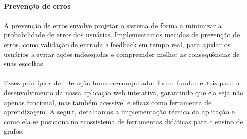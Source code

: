 \documentclass[12pt,a4paper]{article}
\begin{document}
\paragraph{Prevenção de erros}
\paragraph{}
A prevenção de erros envolve projetar o sistema de forma a minimizar a probabilidade de erros dos usuários. Implementamos medidas de prevenção de erros, como validação de entrada e feedback em tempo real, para ajudar os usuários a evitar ações indesejadas e compreender melhor as consequências de suas escolhas.

\paragraph{}
Esses princípios de interação humano-computador foram fundamentais para o desenvolvimento da nossa aplicação web interativa, garantindo que ela seja não apenas funcional, mas também acessível e eficaz como ferramenta de aprendizagem. A seguir, detalhamos a implementação técnica da aplicação e como ela se posiciona no ecossistema de ferramentas didáticas para o ensino de grafos.
\end{document}
